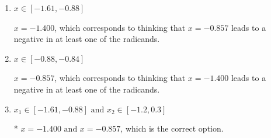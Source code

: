 \documentclass{extbook}[14pt]
\begin{document}
\begin{enumerate}
{\begin{enumerate}[label=\Alph*.]
Corresponds to thinking that $x = -1.400 \text{ and } x = -0.857$ lead to negatives in at least one of the radicands.
\item \( x \in [-1.61,-0.88] \)

$x = -1.400$, which corresponds to thinking that $x = -0.857$ leads to a negative in at least one of the radicands.
\item \( x \in [-0.88,-0.84] \)

$x = -0.857$, which corresponds to thinking that $x = -1.400$ leads to a negative in at least one of the radicands.
\item \( x_1 \in [-1.61, -0.88] \text{ and } x_2 \in [-1.2,0.3] \)

* $x = -1.400 \text{ and } x = -0.857$, which is the correct option.
\end{enumerate}

}
\end{enumerate}
\end{document}
